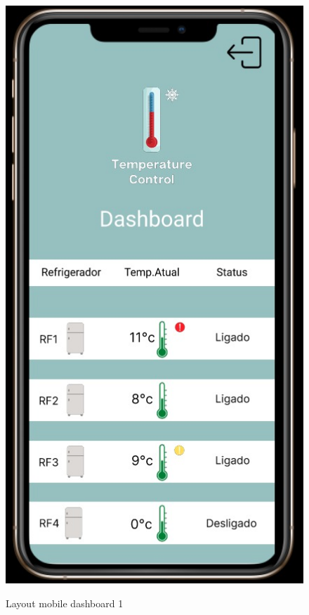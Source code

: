 \documentclass[hidelinks, 12pt, a4paper, brazil, oneside]{abntex2}
\begin{document}
    \begin{figure}[ht]
        \caption{Layout mobile dashboard 1}
        \centering
        \includegraphics[scale=0.5]{img/mobile/dashboard_1.jpeg}
        \label{fig:mobileDashboard1}
    \end{figure}
\end{document}
